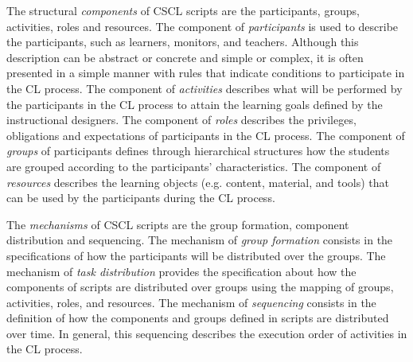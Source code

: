 The structural \emph{components} of CSCL scripts are the participants, groups, activities, roles and resources. The component of \emph{participants} is used to describe the participants, such as learners, monitors, and teachers. Although this description can be abstract or concrete and simple or complex, it is often presented in a simple manner with rules that indicate conditions to participate in the CL process. The component of \emph{activities} describes what will be performed by the participants in the CL process to attain the learning goals defined by the instructional designers. The component of \emph{roles} describes the privileges, obligations and expectations of participants in the CL process. The component of \emph{groups} of participants defines through hierarchical structures how the students are grouped according to the participants' characteristics. The component of \emph{resources} describes the learning objects (e.g. content, material, and tools) that can be used by the participants during the CL process.

The \emph{mechanisms} of CSCL scripts are the group formation, component distribution and sequencing. The mechanism of \emph{group formation} consists in the specifications of how the participants will be distributed over the groups. The mechanism of \emph{task distribution} provides the specification about how the components of scripts are distributed over groups using the mapping of groups, activities, roles, and resources. The mechanism of \emph{sequencing} consists in the definition of how the components and groups defined in scripts are distributed over time. In general, this sequencing describes the execution order of activities in the CL process.

